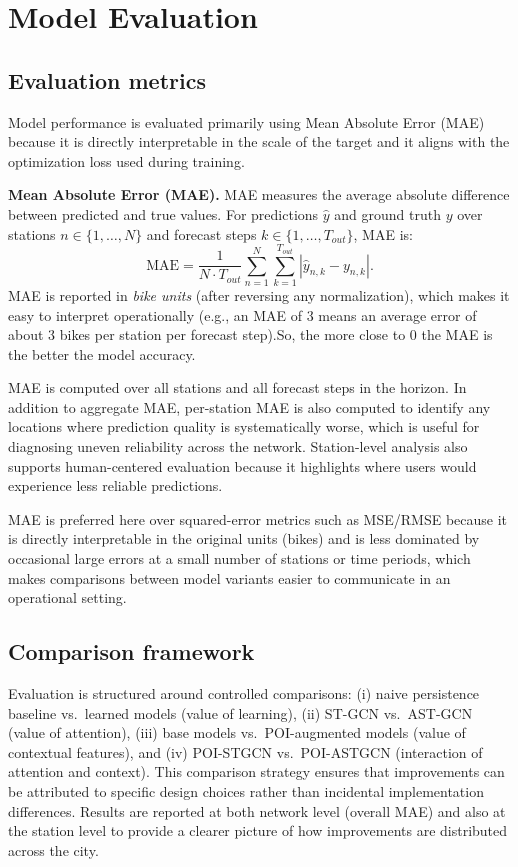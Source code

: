 \documentclass[11pt]{report}
\begin{document}
\section{Model Evaluation}
\subsection{Evaluation metrics}
Model performance is evaluated primarily using Mean Absolute Error (MAE) because it is directly interpretable in the scale of the target and it aligns with the optimization loss used during training. 

\textbf{Mean Absolute Error (MAE).} MAE measures the average absolute difference between predicted and true values. For predictions $\hat{y}$ and ground truth $y$ over stations $n \in \{1,\ldots,N\}$ and forecast steps $k \in \{1,\ldots,T_{out}\}$, MAE is:
\[
\mathrm{MAE} = \frac{1}{N \cdot T_{out}} \sum_{n=1}^{N}\sum_{k=1}^{T_{out}} \left| \hat{y}_{n,k} - y_{n,k} \right|.
\]
MAE is reported in \emph{bike units} (after reversing any normalization), which makes it easy to interpret operationally (e.g., an MAE of 3 means an average error of about 3 bikes per station per forecast step).So, the more close to 0 the MAE is the better the model accuracy.

MAE is computed over all stations and all forecast steps in the horizon. In addition to aggregate MAE, per-station MAE is also computed to identify any locations where prediction quality is systematically worse, which is useful for diagnosing uneven reliability across the network. Station-level analysis also supports human-centered evaluation because it highlights where users would experience less reliable predictions.

MAE is preferred here over squared-error metrics such as MSE/RMSE because it is directly interpretable in the original units (bikes) and is less dominated by occasional large errors at a small number of stations or time periods, which makes comparisons between model variants easier to communicate in an operational setting.

\subsection{Comparison framework}
Evaluation is structured around controlled comparisons:
(i) naive persistence baseline vs.\ learned models (value of learning),
(ii) ST-GCN vs.\ AST-GCN (value of attention),
(iii) base models vs.\ POI-augmented models (value of contextual features), and
(iv) POI-STGCN vs.\ POI-ASTGCN (interaction of attention and context).
This comparison strategy ensures that improvements can be attributed to specific design choices rather than incidental implementation differences. Results are reported at both network level (overall MAE) and also at the station level to provide a clearer picture of how improvements are distributed across the city.
\end{document}
